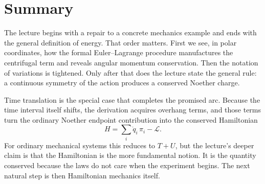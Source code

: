 \section{Summary}

The lecture begins with a repair to a concrete mechanics example and ends with the general definition of energy. That order matters. First we see, in polar coordinates, how the formal Euler--Lagrange procedure manufactures the centrifugal term and reveals angular momentum conservation. Then the notation of variations is tightened. Only after that does the lecture state the general rule: a continuous symmetry of the action produces a conserved Noether charge.

Time translation is the special case that completes the promised arc. Because the time interval itself shifts, the derivation acquires overhang terms, and those terms turn the ordinary Noether endpoint contribution into the conserved Hamiltonian
\begin{equation}
H=\sum_i \dot q_i\,\pi_i-\mathcal{L}.
\end{equation}
For ordinary mechanical systems this reduces to \(T+U\), but the lecture's deeper claim is that the Hamiltonian is the more fundamental notion. It is the quantity conserved because the laws do not care when the experiment begins. The next natural step is then Hamiltonian mechanics itself.